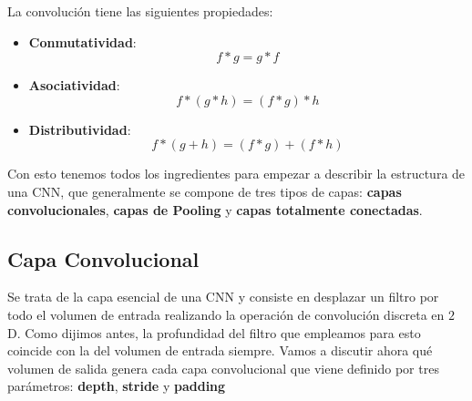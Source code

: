         \noindent La convolución tiene las siguientes propiedades: 

        \begin{itemize}
            \item \textbf{Conmutatividad}: 
            \begin{equation}
                f \ast g = g \ast f
            \end{equation}
            \item \textbf{Asociatividad}: 
            \begin{equation}
                f \ast (g \ast h) = (f \ast g) \ast h
            \end{equation}
            \item \textbf{Distributividad}: 
            \begin{equation}
                f \ast (g + h)= (f\ast g) + (f \ast h)
            \end{equation}
        \end{itemize}

        \noindent Con esto tenemos todos los ingredientes para empezar a describir la estructura de una CNN, que generalmente se compone de tres tipos de capas: \textbf{capas convolucionales}, \textbf{capas de Pooling} y \textbf{capas totalmente conectadas}.

        \subsection{Capa Convolucional}
            \noindent Se trata de la capa esencial de una CNN y consiste en desplazar un filtro por todo el volumen de entrada realizando la operación de convolución discreta en $2$D. Como dijimos antes, la profundidad del filtro que empleamos para esto coincide con la del volumen de entrada siempre. Vamos a discutir ahora qué volumen de salida genera cada capa convolucional que viene definido por tres parámetros: \textbf{depth}, \textbf{stride} y \textbf{padding}

